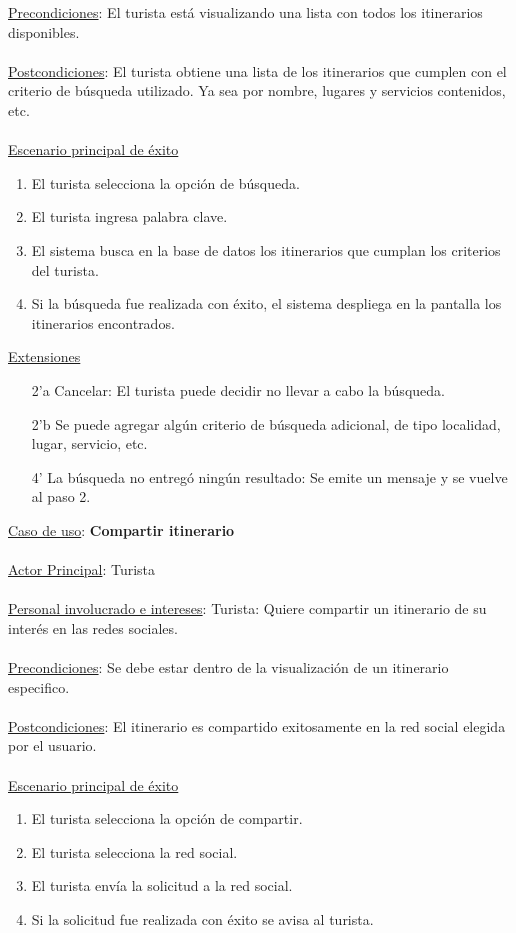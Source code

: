 \documentclass[12pt]{article}
\begin{document}
\underline{Precondiciones}:  El turista está visualizando una lista con todos los itinerarios disponibles.\\\\
\underline{Postcondiciones}: El turista obtiene una lista de los itinerarios que cumplen con el criterio de búsqueda utilizado. Ya sea por nombre, lugares y servicios contenidos, etc.\\\\
\underline{Escenario principal de éxito}
\begin{enumerate}
\item El turista selecciona la opción de búsqueda.
\item El turista ingresa palabra clave.
\item El sistema busca en la base de datos los itinerarios que cumplan los criterios del turista.
\item Si la búsqueda fue realizada con éxito, el sistema despliega en la pantalla los itinerarios encontrados.
\end{enumerate}
\underline{Extensiones}
\begin{enumerate}
\item[2'a] Cancelar: El turista puede decidir no llevar a cabo la búsqueda.
\item[2'b] Se puede agregar algún criterio de búsqueda adicional, de tipo localidad, lugar, servicio, etc.
\item[4'] La búsqueda no entregó ningún resultado: Se emite un mensaje y se vuelve al paso 2.
\end{enumerate}
\underline{Caso de uso}: \textbf{Compartir itinerario}\\\\
\underline{Actor Principal}: Turista\\\\
\underline{Personal involucrado e intereses}: Turista: Quiere compartir un itinerario de su interés en las redes sociales.\\\\
\underline{Precondiciones}: Se debe estar dentro de la visualización de un itinerario especifico.\\\\
\underline{Postcondiciones}: El itinerario es compartido exitosamente en la red social elegida por el usuario.\\\\
\underline{Escenario principal de éxito}
\begin{enumerate}
\item El turista selecciona la opción de compartir.
\item El turista selecciona la red social.
\item El turista envía la solicitud a la red social.
\item Si la solicitud fue realizada con éxito se avisa al turista.
\end{enumerate}
\end{document}
